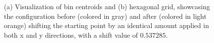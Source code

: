 \documentclass[
  12pt]{article}
\begin{document}
\begin{figure}[H]


\caption{\label{fig-scurveshifthexgridsexp}(a) Visualization of bin
centroids and (b) hexagonal grid, showcasing the configuration before
(colored in gray) and after (colored in light orange) shifting the
starting point by an identical amount applied in both x and y
directions, with a shift value of \(0.537285\).}

\end{figure}%
\end{document}
